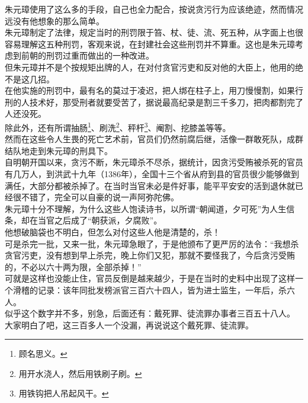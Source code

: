 \begin{multicols}{\theparacolNo}
朱元璋使用了这么多的手段，自己也全力配合，按说贪污行为应该绝迹，然而情况远没有他想象的那么简单。\\

朱元璋制定了法律，规定当时的刑罚限于笞、杖、徒、流、死五种，从字面上也很容易理解这五种刑罚，客观来说，在封建社会这些刑罚并不算重。这也是朱元璋考虑到前朝的刑罚过重而做出的一种改进。\\

但朱元璋并不是个按规矩出牌的人，在对付贪官污吏和反对他的大臣上，他用的绝不是这几招。\\

在他实施的刑罚中，最有名的莫过于凌迟，把人绑在柱子上，用刀慢慢割，如果行刑的人技术好，那受刑者就要受苦了，据说最高纪录是割三千多刀，把肉都割完了人还没死。\\

除此外，还有所谓抽肠\footnote{顾名思义。}、刷洗\footnote{用开水浇人，然后用铁刷子刷。}、秤杆\footnote{用铁钩把人吊起风干。}、阉割、挖膝盖等等。\\

然而在这些令人生畏的死亡艺术前，官员们仍然前腐后继，活像一群敢死队，成群结队地走到朱元璋的刑具下。\\

自明朝开国以来，贪污不断，朱元璋杀不尽杀，据统计，因贪污受贿被杀死的官员有几万人，到洪武十九年（1386年），全国十三个省从府到县的官员很少能够做到满任，大部分都被杀掉了。在当时当官未必是件好事，能平平安安的活到退休就已经很不错了，完全可以自豪的说一声阿弥陀佛。\\

朱元璋十分不理解，为什么这些人饱读诗书，以所谓“朝闻道，夕可死”为人生信条，却在当官之后成了“朝获派，夕腐败”。\\

他想破脑袋也不明白，但怎么对付这些人他是清楚的，杀！\\

可是杀完一批，又来一批，朱元璋急眼了，于是他颁布了更严厉的法令：“我想杀贪官污吏，没有想到早上杀完，晚上你们又犯，那就不要怪我了，今后贪污受贿的，不必以六十两为限，全部杀掉！”\\

可就是这样也没能止住，官员反倒是越来越少，于是在当时的史料中出现了这样一个滑稽的记录：该年同批发榜派官三百六十四人，皆为进士监生，一年后，杀六人。\\

似乎这个数字并不多，别急，后面还有：戴死罪、徒流罪办事者三百五十八人。\\

大家明白了吧，这三百多人一个没漏，再说说这个戴死罪、徒流罪。\\


\end{multicols}
